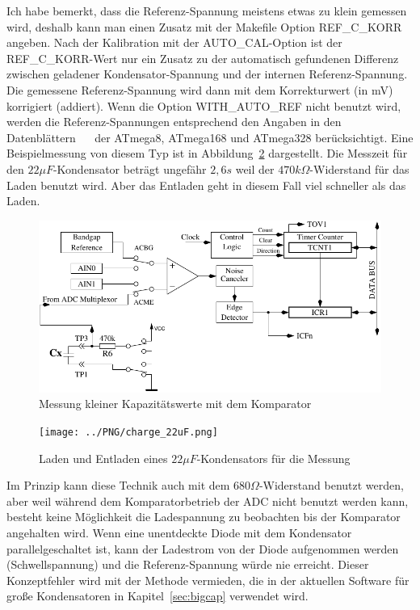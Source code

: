 Ich habe bemerkt, dass die Referenz-Spannung meistens etwas zu klein gemessen wird,
 deshalb kann man einen Zusatz mit der Makefile Option REF\_C\_KORR angeben.
Nach der Kalibration mit der AUTO\_CAL-Option ist der REF\_C\_KORR-Wert nur ein Zusatz zu der automatisch
gefundenen Differenz zwischen geladener Kondensator-Spannung und der internen Referenz-Spannung.
Die gemessene Referenz-Spannung wird dann mit dem Korrekturwert (in mV) korrigiert (addiert).
Wenn die Option WITH\_AUTO\_REF nicht benutzt wird, werden die Referenz-Spannungen entsprechend den Angaben in den
Datenblättern ~\cite{ATmega8}~\cite{ATmega168} der ATmega8, ATmega168 und ATmega328 berücksichtigt.
Eine Beispielmessung von diesem Typ ist in Abbildung~\ref{pic:c22uF} dargestellt.
Die Messzeit für den \(22\mu F\)-Kondensator beträgt ungefähr \(2,6s\) weil der \(470k\Omega\)-Widerstand für das Laden benutzt wird.
Aber das Entladen geht in diesem Fall viel schneller als das Laden.

\begin{figure}[H]
\centering
\includegraphics[]{../FIG/Comparat.pdf}
\caption{Messung kleiner Kapazitätswerte mit dem Komparator}
\label{fig:comparat}
\end{figure}

\begin{figure}[H]
  \centering
    \texttt{[image: ../PNG/charge\_22uF.png]}
  \caption{Laden und Entladen eines \(22\mu F\)-Kondensators für die Messung}
  \label{pic:c22uF}
\end{figure}


Im Prinzip kann diese Technik auch mit dem \(680\Omega\)-Widerstand benutzt werden,
aber weil während dem Komparatorbetrieb der ADC nicht benutzt werden kann, besteht keine
Möglichkeit die Ladespannung zu beobachten bis der Komparator angehalten wird.
Wenn eine unentdeckte Diode mit dem Kondensator parallelgeschaltet ist, kann der Ladestrom
von der Diode aufgenommen werden (Schwellspannung) und die Referenz-Spannung würde nie erreicht.
Dieser Konzeptfehler wird mit der Methode vermieden, die in der aktuellen Software für große Kondensatoren in Kapitel~\ref{sec:bigcap}
verwendet wird.

